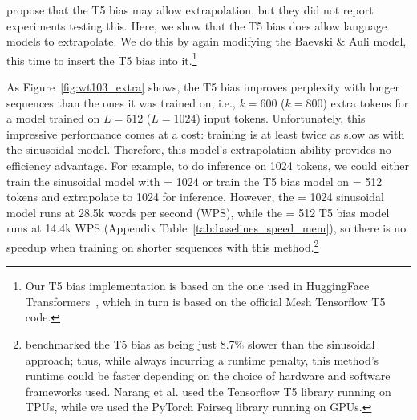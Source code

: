 \cite{t5} propose that the T5 bias may allow extrapolation, but they did not report experiments testing this.  Here, we show that the T5 bias does allow language models to extrapolate.
We do this by again modifying the Baevski \& Auli model, this time to insert the T5 bias into it.\footnote{Our T5 bias implementation is based on the one used in HuggingFace Transformers~\citep{huggingface}, which in turn is based on the official Mesh Tensorflow T5 code. }

As Figure~\ref{fig:wt103_extra} shows, the T5 bias improves perplexity with longer sequences than the ones it was trained on, i.e.,  $k=600$ ($k=800$) extra tokens for a model trained on $L=512$ ($L=1024$) input tokens.  Unfortunately, this impressive performance comes at a cost: training is at least twice as slow as with the sinusoidal model. Therefore, this model's extrapolation ability provides no efficiency advantage. For example, to do inference on 1024 tokens, we could either train the sinusoidal model with \lt = 1024 or train the T5 bias model on \lt = 512 tokens and extrapolate to 1024 for inference. However, the \lt = 1024 sinusoidal model runs at 28.5k words per second (WPS), while the \lt = 512 T5 bias model runs at 14.4k WPS (Appendix Table~\ref{tab:baselines_speed_mem}), so there is no speedup when training on shorter sequences with this method.\footnote{ \citet{narang2021transformer} benchmarked the T5 bias as being just 8.7\% slower than the sinusoidal approach; thus,   while always incurring a runtime penalty, this method's runtime could be faster depending on the choice of hardware and software frameworks used. Narang et al. used the Tensorflow T5 library running on TPUs, while we used the PyTorch Fairseq library running on GPUs. }




















